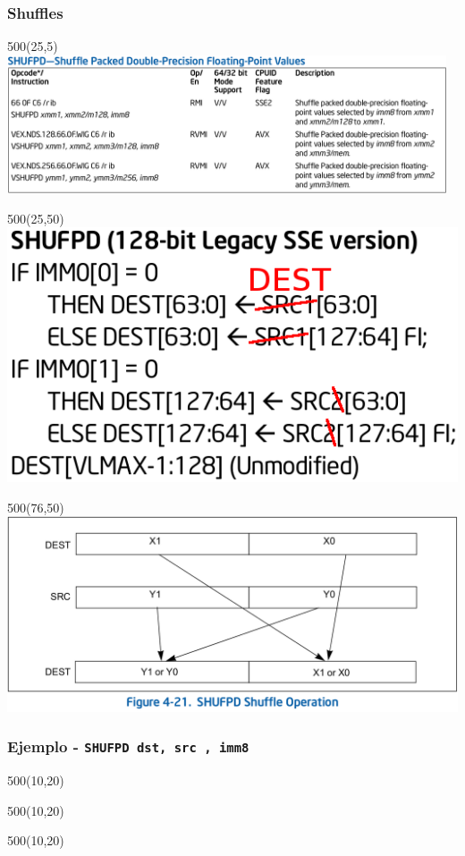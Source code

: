 \documentclass[aspectratio=169]{beamer}
\begin{document}
\begin{frame}[fragile,t]
	\frametitle{Shuffles}
	\begin{textblock}{500}(25,5)
	\includegraphics[width=13cm]{img/SHUFPD.png}
	\end{textblock}
	\begin{textblock}{500}(25,50)
	\includegraphics[scale=0.22]{img/SHUFPD_code.png}
	\end{textblock}
	\begin{textblock}{500}(76,50)
	\includegraphics[scale=0.19]{img/SHUFPD_pic.png}
	\end{textblock}
\end{frame}

\begin{frame}[fragile,t]
	\frametitle{Ejemplo - \texttt{SHUFPD dst, src , imm8}}
	\begin{textblock}{500}(10,20)  \end{textblock} %
	\begin{textblock}{500}(10,20)  \end{textblock} %
	\begin{textblock}{500}(10,20)  \end{textblock} %
\end{frame}
\end{document}
